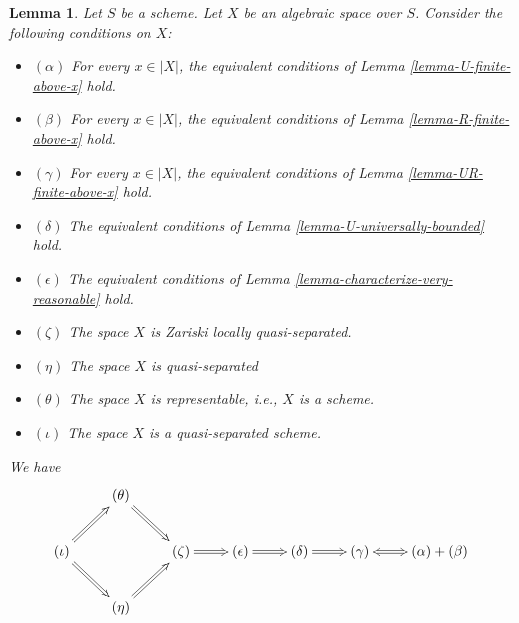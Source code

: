\documentclass{stacks-project}
\theoremstyle{plain}
\newtheorem{lemma}[subsection]{Lemma}
\theoremstyle{definition}
\theoremstyle{remark}
\numberwithin{equation}{subsection}
\begin{document}
\begin{lemma}
\label{lemma-bounded-fibres}
Let $S$ be a scheme. Let $X$ be an algebraic space over $S$.
Consider the following conditions on $X$:
\begin{itemize}
\item[] $(\alpha)$ For every $x \in |X|$, the equivalent conditions of
Lemma \ref{lemma-U-finite-above-x}
hold.
\item[] $(\beta)$ For every $x \in |X|$, the equivalent conditions of
Lemma \ref{lemma-R-finite-above-x}
hold.
\item[] $(\gamma)$ For every $x \in |X|$, the equivalent conditions of
Lemma \ref{lemma-UR-finite-above-x}
hold.
\item[] $(\delta)$ The equivalent conditions of
Lemma \ref{lemma-U-universally-bounded}
hold.
\item[] $(\epsilon)$ The equivalent conditions of
Lemma \ref{lemma-characterize-very-reasonable}
hold.
\item[] $(\zeta)$ The space $X$ is Zariski locally quasi-separated.
\item[] $(\eta)$ The space $X$ is quasi-separated
\item[] $(\theta)$ The space $X$ is representable, i.e., $X$ is a scheme.
\item[] $(\iota)$ The space $X$ is a quasi-separated scheme.
\end{itemize}
We have
$$
\xymatrix{
& (\theta) \ar@{=>}[rd] & & & &  \\
(\iota) \ar@{=>}[ru] \ar@{=>}[rd] & &
(\zeta) \ar@{=>}[r] &
(\epsilon) \ar@{=>}[r] &
(\delta) \ar@{=>}[r] &
(\gamma) \ar@{<=>}[r] & (\alpha) + (\beta) \\
& (\eta) \ar@{=>}[ru] & & & &
}
$$
\end{lemma}
\end{document}
